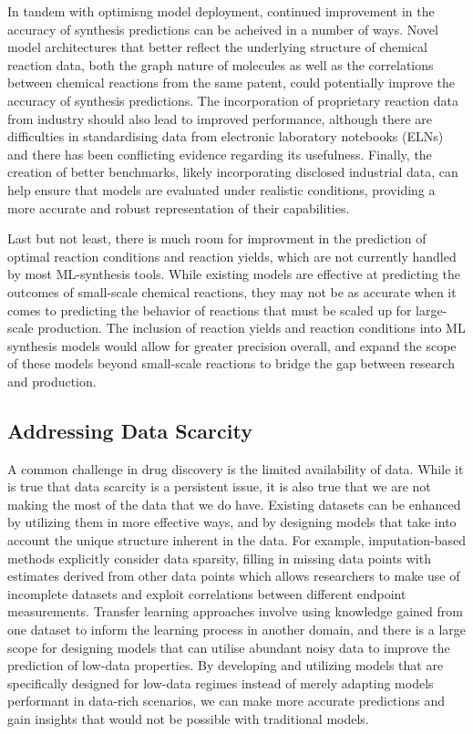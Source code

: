 In tandem with optimisng model deployment, continued improvement in the accuracy of synthesis predictions can be acheived in a number of ways. Novel model architectures that better reflect the underlying structure of chemical reaction data, both the graph nature of molecules as well as the correlations between chemical reactions from the same patent, could potentially improve the accuracy of synthesis predictions. The incorporation of proprietary reaction data from industry should also lead to improved performance, although there are difficulties in standardising data from electronic laboratory notebooks (ELNs) and there has been conflicting evidence regarding its usefulness. Finally, the creation of better benchmarks, likely incorporating disclosed industrial data, can help ensure that models are evaluated under realistic conditions, providing a more accurate and robust representation of their capabilities.

Last but not least, there is much room for improvment in the prediction of optimal reaction conditions and reaction yields, which are not currently handled by most ML-synthesis tools.  While existing models are effective at predicting the outcomes of small-scale chemical reactions, they may not be as accurate when it comes to predicting the behavior of reactions that must be scaled up for large-scale production. The inclusion of reaction yields and reaction conditions into ML synthesis models would allow for greater precision overall, and expand the scope of these models beyond small-scale reactions to bridge the gap between research and production.

\subsection{Addressing Data Scarcity}

A common challenge in drug discovery is the limited availability of data. While it is true that data scarcity is a persistent issue, it is also true that we are not making the most of the data that we do have. Existing datasets can be enhanced by utilizing them in more effective ways, and by designing models that take into account the unique structure inherent in the data. For example, imputation-based methods explicitly consider data sparsity, filling in missing data points with estimates derived from other data points which allows researchers to make use of incomplete datasets and exploit correlations between different endpoint measurements. Transfer learning approaches involve using knowledge gained from one dataset to inform the learning process in another domain, and there is a large scope for designing models that can utilise abundant noisy data to improve the prediction of low-data properties. By developing and utilizing models that are specifically designed for low-data regimes instead of merely adapting models performant in data-rich scenarios, we can make more accurate predictions and gain insights that would not be possible with traditional models.

